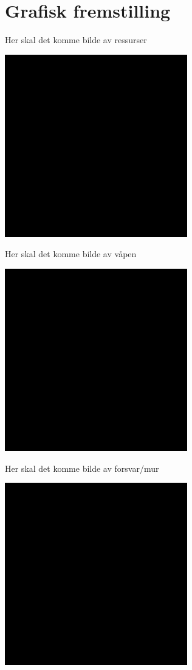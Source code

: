 \section{Grafisk fremstilling}

Her skal det komme bilde av ressurser

\begin{center}
\includegraphics[scale=0.75]{ressurser.png}
\end{center}

Her skal det komme bilde av våpen

\begin{center}
\includegraphics[scale=0.75]{vaapen.png}
\end{center}


Her skal det komme bilde av forsvar/mur

\begin{center}
\includegraphics[scale=0.75]{forsvar.png}
\end{center}

